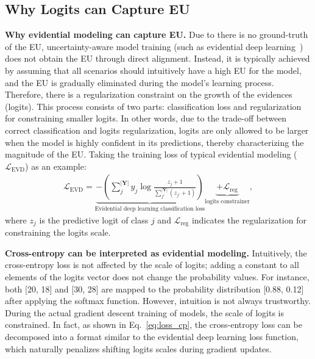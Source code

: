 \subsection{Why Logits can Capture EU}


\textbf{Why evidential modeling can capture EU.} Due to there is no ground-truth of the EU, uncertainty-aware model training (such as evidential deep learning~\cite{sensoy2018evidential}) does not obtain the EU through direct alignment. Instead, it is typically achieved by assuming that all scenarios should intuitively have a high EU for the model, and the EU is gradually eliminated during the model's learning process. Therefore, there is a regularization constraint on the growth of the evidences (logits). This process consists of two parts: classification loss and regularization for constraining smaller logits. In other words, due to the trade-off between correct classification and logits regularization, logits are only allowed to be larger when the model is highly confident in its predictions, thereby characterizing the magnitude of the EU. Taking the training loss of typical evidential modeling ($\mathcal{L}_\text{EVD}$) as an example:
\begin{equation}
\begin{aligned}
    \mathcal{L}_\text{EVD} =\underbrace{-\left( \sum_{j}^{|\bm{Y}|} y_{j}\log \frac{z_{j}+1}{\sum_{j'}^{|\bm{Y}|} (z_{j'}+1)} \right)}_{\text{Evidential deep learning classification loss}} \underbrace{+ \mathcal{L}_{\text{reg}}}_{\text{logits constrainer}},
\end{aligned}
\end{equation}
where $z_j$ is the predictive logit of class $j$ and $\mathcal{L}_{\text{reg}}$ indicates the regularization for constraining the logits scale.

\textbf{Cross-entropy can be interpreted as evidential modeling.} Intuitively, the cross-entropy loss is not affected by the scale of logits; adding a constant to all elements of the logits vector does not change the probability values. For instance, both [20, 18] and [30, 28] are mapped to the probability distribution [0.88, 0.12] after applying the softmax function. However, intuition is not always trustworthy. During the actual gradient descent training of models, the scale of logits is constrained. In fact, as shown in Eq.~\ref{eq:loss_cp}, the cross-entropy loss can be decomposed into a format similar to the evidential deep learning loss function, which naturally penalizes shifting logits scales during gradient updates.








